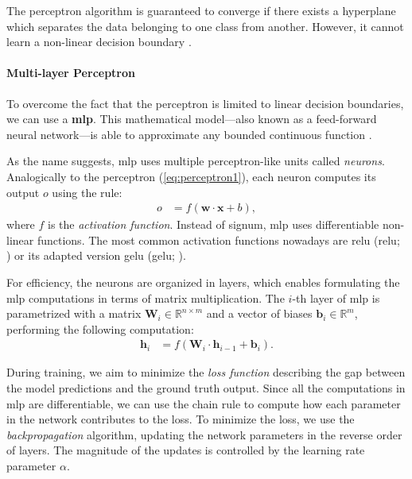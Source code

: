 The perceptron algorithm is guaranteed to converge if there exists a hyperplane which separates the data belonging to one class from another. However, it cannot learn a non-linear decision boundary  \cite{novikoff1962convergence}.

\paragraph{Multi-layer Perceptron} To overcome the fact that the perceptron is limited to linear decision boundaries, we can use a \textbf{\ac{mlp}}. This mathematical model---also known as a feed-forward neural network---is able to approximate any bounded continuous function \cite{hornik1989multilayer}.

As the name suggests, \ac{mlp} uses multiple perceptron-like units called \textit{neurons}. Analogically to the perceptron (\autoref{eq:perceptron1}), each neuron computes its output $o$ using the rule:
\begin{align}
    o & = f(\mathbf{w} \cdot \mathbf{x} + b),
\end{align}
where $f$ is the \emph{activation function}. Instead of signum, \ac{mlp} uses differentiable non-linear functions. The most common activation functions nowadays are \acl{relu} (\acs{relu}; \citealp{nair2010rectified}) or its adapted version \acl{gelu} (\acs{gelu}; \citealp{hendrycks2016gaussian}).

For efficiency, the neurons are organized in layers, which enables formulating the \ac{mlp} computations in terms of matrix multiplication. The $i$-th layer of \ac{mlp} is parametrized with a matrix $\mathbf{W}_i \in \mathbb{R}^{n\times m}$ and a vector of biases $\mathbf{b}_i \in \mathbb{R}^{m}$, performing the following computation:
\begin{align}
    \mathbf{h}_i & = f(\mathbf{W}_i \cdot \mathbf{h}_{i-1} + \mathbf{b}_i).
\end{align}

During training, we aim to minimize the \textit{loss function} describing the gap between the model predictions and the ground truth output. Since all the computations in \ac{mlp} are differentiable, we can use the chain rule to compute how each parameter in the network contributes to the loss. To minimize the loss, we use the \emph{backpropagation} algorithm, updating the network parameters in the reverse order of layers. The magnitude of the updates is controlled by the learning rate parameter $\alpha$.

